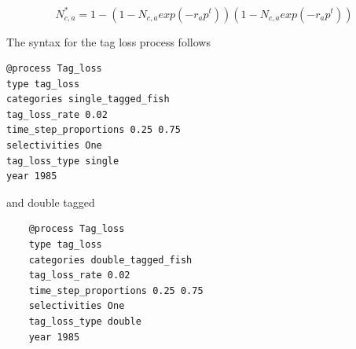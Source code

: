 \begin{equation}
N^*_{c,a} = 1 - \left(1 - N_{c,a} exp\left( - r_a p^t\right)\right)\left(1 - N_{c,a} exp\left( - r_a p^t\right)\right)
\end{equation}


The syntax for the tag loss process follows

{\small{\begin{verbatim}
@process Tag_loss
type tag_loss
categories single_tagged_fish
tag_loss_rate 0.02
time_step_proportions 0.25 0.75
selectivities One
tag_loss_type single
year 1985
\end{verbatim}}}

and double tagged

{\small{\begin{verbatim}
	@process Tag_loss
	type tag_loss
	categories double_tagged_fish
	tag_loss_rate 0.02
	time_step_proportions 0.25 0.75
	selectivities One
	tag_loss_type double
	year 1985
\end{verbatim}}}
